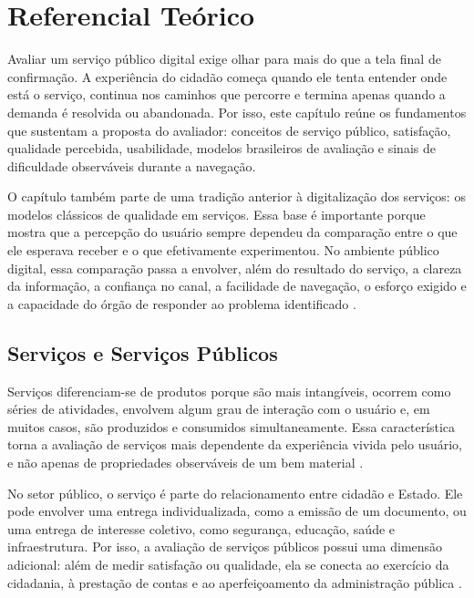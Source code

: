 \chapter{Referencial Teórico}

Avaliar um serviço público digital exige olhar para mais do que a tela final de
confirmação. A experiência do cidadão começa quando ele tenta entender onde está
o serviço, continua nos caminhos que percorre e termina apenas quando a demanda
é resolvida ou abandonada. Por isso, este capítulo reúne os fundamentos que
sustentam a proposta do avaliador: conceitos de serviço público, satisfação,
qualidade percebida, usabilidade, modelos brasileiros de avaliação e sinais de
dificuldade observáveis durante a navegação.

O capítulo também parte de uma tradição anterior à digitalização dos serviços:
os modelos clássicos de qualidade em serviços. Essa base é importante porque
mostra que a percepção do usuário sempre dependeu da comparação entre o que ele
esperava receber e o que efetivamente experimentou. No ambiente público digital,
essa comparação passa a envolver, além do resultado do serviço, a clareza da
informação, a confiança no canal, a facilidade de navegação, o esforço exigido e
a capacidade do órgão de responder ao problema identificado
\cite{gronroos1984service,parasuraman1988servqual,deloneMclean2003}.

\section{Serviços e Serviços Públicos}

Serviços diferenciam-se de produtos porque são mais intangíveis, ocorrem como
séries de atividades, envolvem algum grau de interação com o usuário e, em muitos
casos, são produzidos e consumidos simultaneamente. Essa característica torna a
avaliação de serviços mais dependente da experiência vivida pelo usuário, e não
apenas de propriedades observáveis de um bem material
\cite{gronroos1984service,limaPereira2020modulo1}.

No setor público, o serviço é parte do relacionamento entre cidadão e Estado. Ele
pode envolver uma entrega individualizada, como a emissão de um documento, ou uma
entrega de interesse coletivo, como segurança, educação, saúde e infraestrutura.
Por isso, a avaliação de serviços públicos possui uma dimensão adicional: além de
medir satisfação ou qualidade, ela se conecta ao exercício da cidadania, à
prestação de contas e ao aperfeiçoamento da administração pública
\cite{brasil2017lei13460,brasil2021lei14129,limaPereira2020modulo1}.


